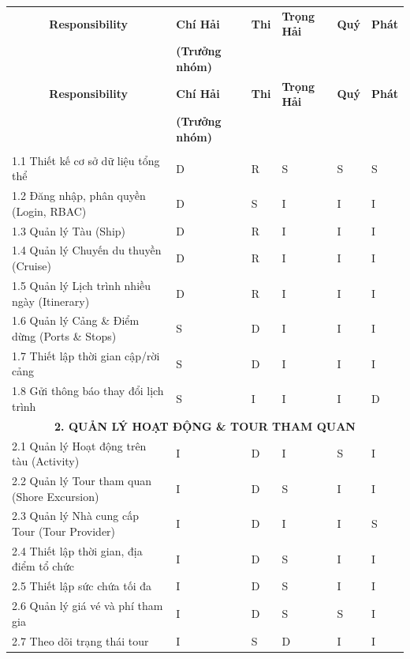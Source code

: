 \documentclass[a4paper,12pt]{article}
\begin{document}
	\begin{longtable}{|p{5.5cm}|p{2.2cm}|p{2.2cm}|p{2.2cm}|p{2.2cm}|p{2.2cm}|}
		\hline
		\multicolumn{1}{|c|}{\textbf{Responsibility}} & \textbf{Chí Hải} & \textbf{Thi} & \textbf{Trọng Hải} & \textbf{Quý} & \textbf{Phát} \\
		\multicolumn{1}{|c|}{} & \textbf{(Trưởng nhóm)} & & & & \\
		\hline
		\endfirsthead
		\hline
		\multicolumn{1}{|c|}{\textbf{Responsibility}} & \textbf{Chí Hải} & \textbf{Thi} & \textbf{Trọng Hải} & \textbf{Quý} & \textbf{Phát} \\
		\multicolumn{1}{|c|}{} & \textbf{(Trưởng nhóm)} & & & & \\
		\hline
		\endhead
		\hline
		\endfoot
		\multicolumn{6}{|c|}{\textbf{1. QUẢN LÝ CHUYẾN ĐI \& LỊCH TRÌNH}} \\
		\hline
		1.1 Thiết kế cơ sở dữ liệu tổng thể & D & R & S & S & S \\
		\hline
		1.2 Đăng nhập, phân quyền (Login, RBAC) & D & S & I & I & I \\
		\hline
		1.3 Quản lý Tàu (Ship) & D & R & I & I & I \\
		\hline
		1.4 Quản lý Chuyến du thuyền (Cruise) & D & R & I & I & I \\
		\hline
		1.5 Quản lý Lịch trình nhiều ngày (Itinerary) & D & R & I & I & I \\
		\hline
		1.6 Quản lý Cảng \& Điểm dừng (Ports \& Stops) & S & D & I & I & I \\
		\hline
		1.7 Thiết lập thời gian cập/rời cảng & S & D & I & I & I \\
		\hline
		1.8 Gửi thông báo thay đổi lịch trình & S & I & I & I & D \\
		\hline
		\multicolumn{6}{|c|}{\textbf{2. QUẢN LÝ HOẠT ĐỘNG \& TOUR THAM QUAN}} \\
		\hline
		2.1 Quản lý Hoạt động trên tàu (Activity) & I & D & I & S & I \\
		\hline
		2.2 Quản lý Tour tham quan (Shore Excursion) & I & D & S & I & I \\
		\hline
		2.3 Quản lý Nhà cung cấp Tour (Tour Provider) & I & D & I & I & S \\
		\hline
		2.4 Thiết lập thời gian, địa điểm tổ chức & I & D & S & I & I \\
		\hline
		2.5 Thiết lập sức chứa tối đa & I & D & S & I & I \\
		\hline
		2.6 Quản lý giá vé và phí tham gia & I & D & S & S & I \\
		\hline
		2.7 Theo dõi trạng thái tour & I & S & D & I & I \\

\end{longtable}
\end{document}
